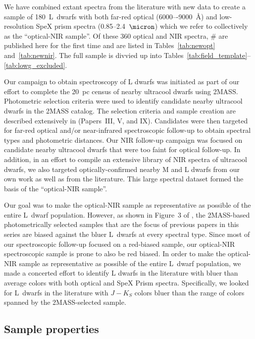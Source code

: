 \documentclass[12pt,preprint]{aastex}
\newcommand{\sample}{180}
\newcommand{\prismspectra}{140} %
\begin{document}
We have combined extant spectra from the literature with new data to create a sample of \sample~L~dwarfs with both far-red optical (6000–-9000~\AA) and low-resolution SpeX prism spectra (0.85--2.4~$\micron$) which we refer to collectively as the ``optical-NIR sample''. 
Of these 360 optical and NIR spectra, \# are published here for the first time and are listed in Tables~\ref{tab:newopt} and~\ref{tab:newnir}. 
The full sample is divvied up into Tables~\ref{tab:field_template}--\ref{tab:lowg_excluded}.

Our campaign to obtain spectroscopy of L dwarfs was initiated as part of our effort to complete the 20~pc census of nearby ultracool dwarfs using 2MASS. Photometric selection criteria were used to identify candidate nearby ultracool dwarfs in the 2MASS catalog. The selection criteria and sample creation are described extensively in \cite{Cruz03,Cruz07,Reid08} (Papers~III, V, and IX). Candidates were then targeted for far-red optical and/or near-infrared spectroscopic follow-up to obtain spectral types and photometric distances. Our NIR follow-up campaign was focused on candidate nearby ultracool dwarfs that were too faint for optical follow-up. In addition, in an effort to compile an extensive library of NIR spectra of ultracool dwarfs, we also targeted optically-confirmed nearby M and L dwarfs from our own work as well as from the literature. This large spectral dataset formed the basis of the ``optical-NIR sample''.

Our goal was to make the optical-NIR sample as representative as possible of the entire L~dwarf population. 
However, as shown in Figure~3 of \cite{Schmidt10}, the 2MASS-based photometrically selected samples that are the focus of previous papers in this series \citep{Cruz03, Reid08} are biased against the bluer L~dwarfs at every spectral type. 
Since most of our spectroscopic follow-up focused on a red-biased sample, our optical-NIR spectroscopic sample is prone to also be red biased. 
In order to make the optical-NIR sample as representative as possible of the entire L~dwarf population, we made a concerted effort to identify L dwarfs in the literature with bluer than average colors with both optical and SpeX Prism spectra.
Specifically, we looked for L~dwarfs in the literature with $J-K_S$ colors bluer than the range of colors spanned by the 2MASS-selected sample. 

\subsection{Sample properties}
\end{document}
